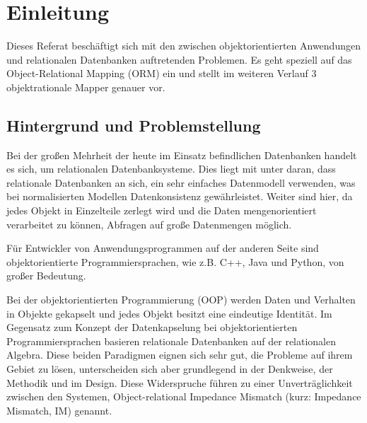 
\chapter{Einleitung} %

\label{Chapter1} %


\newcommand{\keyword}[1]{\textbf{#1}}
\newcommand{\tabhead}[1]{\textbf{#1}}
\newcommand{\code}[1]{\texttt{#1}}
\newcommand{\file}[1]{\texttt{\bfseries#1}}
\newcommand{\option}[1]{\texttt{\itshape#1}}


Dieses Referat beschäftigt sich mit den zwischen objektorientierten Anwendungen und relationalen Datenbanken auftretenden Problemen. Es geht speziell auf das Object-Relational Mapping (ORM) ein und stellt im weiteren Verlauf 3 objektrationale Mapper genauer vor.

\section{Hintergrund und Problemstellung}

Bei der großen Mehrheit der heute im Einsatz befindlichen Datenbanken handelt es sich, um relationalen Datenbanksysteme.  Dies liegt mit unter daran, dass relationale Datenbanken an sich, ein sehr einfaches Datenmodell verwenden, was bei normalisierten Modellen Datenkonsistenz gewährleistet. Weiter sind hier, da jedes Objekt in Einzelteile zerlegt wird und die Daten mengenorientiert verarbeitet zu können, Abfragen auf große Datenmengen möglich.

Für Entwickler von Anwendungsprogrammen auf der anderen Seite sind objektorientierte Programmiersprachen, wie z.B. C++, Java und Python, von großer Bedeutung. 

Bei der objektorientierten Programmierung (OOP) werden Daten und Verhalten in Objekte gekapselt und jedes Objekt besitzt eine eindeutige Identität. Im Gegensatz zum Konzept der Datenkapselung bei objektorientierten Programmiersprachen basieren relationale Datenbanken auf der relationalen Algebra. Diese beiden Paradigmen eignen sich sehr gut, die Probleme auf ihrem Gebiet zu lösen, unterscheiden sich aber grundlegend in der Denkweise, der Methodik und im Design. Diese Widerspruche führen zu einer Unverträglichkeit zwischen den Systemen, Object-relational Impedance Mismatch (kurz: Impedance Mismatch, IM) genannt.

